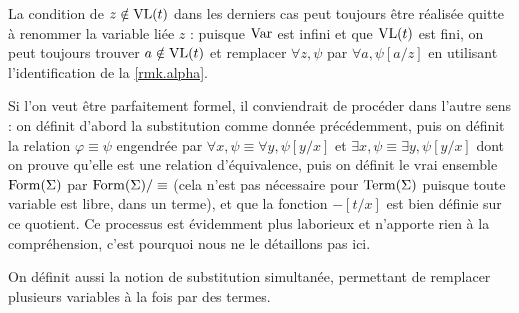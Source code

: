 \begin{remark}
  La condition de $z\notin\operatorname{VL}(t)$ dans les derniers cas peut toujours être
  réalisée quitte à renommer la variable liée $z$ : puisque $\operatorname{Var}$ est infini
  et que $\operatorname{VL}(t)$ est fini, on peut toujours trouver $a\notin\operatorname{VL}(t)$ et
  remplacer $\forall z, \psi$ par $\forall a, \psi[a/z]$ en utilisant
  l'identification de la \cref{rmk.alpha}.

  Si l'on veut être parfaitement formel, il conviendrait de procéder dans
  l'autre sens : on définit d'abord la substitution comme donnée précédemment,
  puis on définit la relation $\varphi \equiv \psi$ engendrée par
  $\forall x, \psi \equiv \forall y, \psi[y/x]$ et
  $\exists x,\psi \equiv\exists y, \psi[y/x]$ dont on prouve qu'elle est une
  relation d'équivalence, puis on définit le \og vrai\fg{} ensemble
  $\operatorname{Form}(\Sigma)$ par $\operatorname{Form}(\Sigma)/ \equiv$ (cela n'est pas nécessaire
  pour $\operatorname{Term}(\Sigma)$ puisque toute variable est libre, dans un terme), et que
  la fonction $-[t/x]$ est bien définie sur ce quotient. Ce processus est
  évidemment plus laborieux et n'apporte rien à la compréhension, c'est pourquoi
  nous ne le détaillons pas ici.
\end{remark}

On définit aussi la notion de substitution simultanée, permettant de remplacer
plusieurs variables à la fois par des termes.


